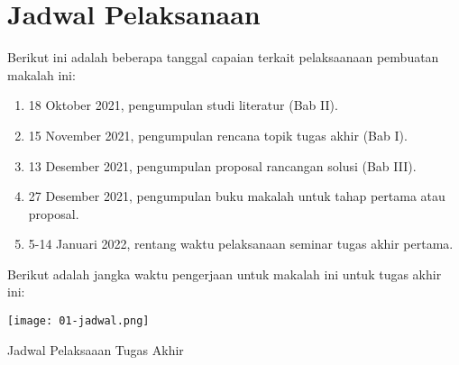 \section{Jadwal Pelaksanaan}

Berikut ini adalah beberapa tanggal capaian terkait pelaksaanaan pembuatan makalah ini:

\begin{enumerate}
  \item 18 Oktober 2021, pengumpulan studi literatur (Bab II).
  \item 15 November 2021, pengumpulan rencana topik tugas akhir (Bab I).
  \item 13 Desember 2021, pengumpulan proposal rancangan solusi (Bab III).
  \item 27 Desember 2021, pengumpulan buku makalah untuk tahap pertama atau proposal.
  \item 5-14 Januari 2022, rentang waktu pelaksanaan seminar tugas akhir pertama.
\end{enumerate}

Berikut adalah jangka waktu pengerjaan untuk makalah ini untuk tugas akhir ini:

\begin{table}[ht]
  \centering
  \texttt{[image: 01-jadwal.png]}
  \caption{Jadwal Pelaksaaan Tugas Akhir}
\end{table}


    

